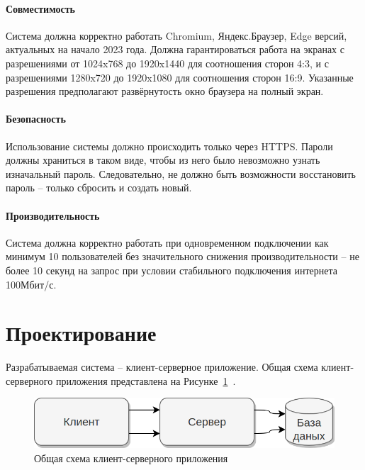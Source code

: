 \documentclass[a4paper,article]{article}
\begin{document}
\begin{sloppypar}
    \paragraph{Совместимость}\label{ТЗ. Интерфейс пользователя}

    Система должна корректно работать Chromium, Яндекс.Браузер, Edge версий, актуальных на начало 2023 года. Должна гарантироваться работа на экранах с разрешениями от 1024x768 до 1920x1440 для соотношения сторон 4:3, и с разрешениями 1280x720 до 1920x1080 для соотношения сторон 16:9. Указанные разрешения предполагают развёрнутость окно браузера на полный экран.

    \paragraph{Безопасность}\label{ТЗ. Безопасность}

    Использование системы должно происходить только через HTTPS. Пароли должны храниться в таком виде, чтобы из него было невозможно узнать изначальный пароль. Следовательно, не должно быть возможности восстановить пароль -- только сбросить и создать новый.

    \paragraph{Производительность}\label{ТЗ. Производительность}

    Система должна корректно работать при одновременном подключении как минимум 10 пользователей без значительного снижения производительности -- не более 10 секунд на запрос при условии стабильного подключения интернета 100Мбит/с.

    \newpage

    \section{Проектирование}\label{Проектирование}

    Разрабатываемая система -- клиент-серверное приложение. Общая схема клиент-серверного приложения представлена на Рисунке~\ref{fig:Схема клиент-серверного приложения}~\cite{webapi, cleanarch}.

    \begin{figure}[h]
        \centering
        \includegraphics[width=0.6\linewidth]{Схема клиент-серверного приложения.png}
        \caption{\centering Общая схема клиент-серверного приложения}
        \label{fig:Схема клиент-серверного приложения}
    \end{figure}


\end{sloppypar}
\end{document}
